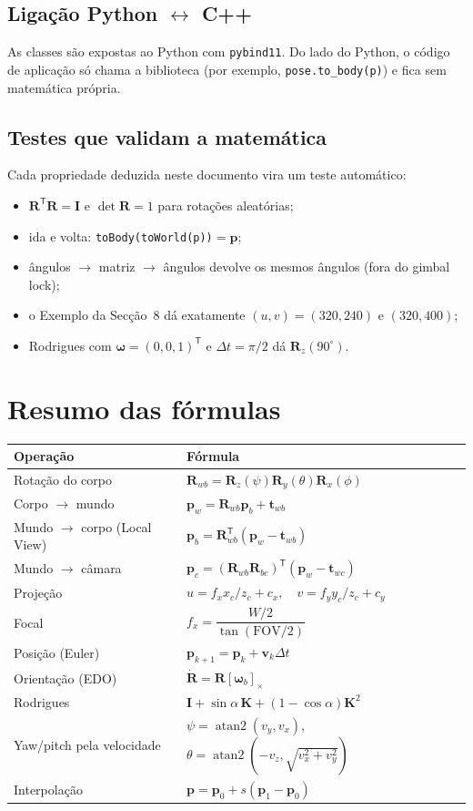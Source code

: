 \documentclass[11pt,a4paper]{article}
\newcommand{\vv}[1]{\mathbf{#1}}              %
\newcommand{\Rot}{\mathbf{R}}
\newcommand{\Id}{\mathbf{I}}
\newcommand{\T}{^{\mathsf{T}}}
\theoremstyle{definition}
\begin{document}
\subsection{Ligação Python $\leftrightarrow$ C++}
As classes são expostas ao Python com \texttt{pybind11}. Do lado do Python, o código de aplicação só chama a biblioteca (por exemplo, \texttt{pose.to\_body(p)}) e fica sem matemática própria.

\subsection{Testes que validam a matemática}
Cada propriedade deduzida neste documento vira um teste automático:
\begin{itemize}[nosep]
  \item $\Rot\T\Rot=\Id$ e $\det\Rot=1$ para rotações aleatórias;
  \item ida e volta: \texttt{toBody(toWorld(p))}$=\vv{p}$;
  \item ângulos $\to$ matriz $\to$ ângulos devolve os mesmos ângulos (fora do gimbal lock);
  \item o Exemplo da Secção~8 dá exatamente $(u,v)=(320,240)$ e $(320,400)$;
  \item Rodrigues com $\vv{\omega}=(0,0,1)\T$ e $\Delta t=\pi/2$ dá $\Rot_z(90^\circ)$.
\end{itemize}

\section{Resumo das fórmulas}
\begin{table}[H]
\centering
\renewcommand{\arraystretch}{1.5}
\begin{tabular}{ll}
\toprule
Operação & Fórmula\\
\midrule
Rotação do corpo & $\Rot_{wb}=\Rot_z(\psi)\Rot_y(\theta)\Rot_x(\phi)$\\
Corpo $\to$ mundo & $\vv{p}_w=\Rot_{wb}\vv{p}_b+\vv{t}_{wb}$\\
Mundo $\to$ corpo (Local View) & $\vv{p}_b=\Rot_{wb}\T(\vv{p}_w-\vv{t}_{wb})$\\
Mundo $\to$ câmara & $\vv{p}_c=(\Rot_{wb}\Rot_{bc})\T(\vv{p}_w-\vv{t}_{wc})$\\
Projeção & $u=f_x x_c/z_c+c_x,\quad v=f_y y_c/z_c+c_y$\\
Focal & $f_x=\dfrac{W/2}{\tan(\mathrm{FOV}/2)}$\\
Posição (Euler) & $\vv{p}_{k+1}=\vv{p}_k+\vv{v}_k\Delta t$\\
Orientação (EDO) & $\dot{\Rot}=\Rot[\vv{\omega}_b]_\times$\\
Rodrigues & $\Id+\sin\alpha\,\mathbf{K}+(1-\cos\alpha)\mathbf{K}^2$\\
Yaw/pitch pela velocidade & $\psi=\operatorname{atan2}(v_y,v_x)$, $\theta=\operatorname{atan2}(-v_z,\sqrt{v_x^2+v_y^2})$\\
Interpolação & $\vv{p}=\vv{p}_0+s(\vv{p}_1-\vv{p}_0)$\\
\bottomrule
\end{tabular}
\end{table}
\end{document}
